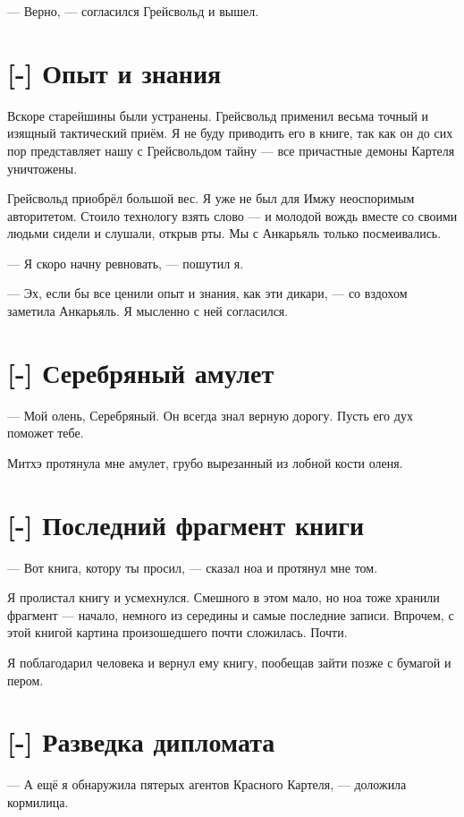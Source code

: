 --- Верно, --- согласился Грейсвольд и вышел.

\section{[-] Опыт и знания}

Вскоре старейшины были устранены.
Грейсвольд применил весьма точный и изящный тактический приём.
Я не буду приводить его в книге, так как он до сих пор представляет нашу с Грейсвольдом тайну --- все причастные демоны Картеля уничтожены.

Грейсвольд приобрёл большой вес.
Я уже не был для Имжу неоспоримым авторитетом.
Стоило технологу взять слово --- и молодой вождь вместе со своими людьми сидели и слушали, открыв рты.
Мы с Анкарьяль только посмеивались.

--- Я скоро начну ревновать, --- пошутил я.

--- Эх, если бы все ценили опыт и знания, как эти дикари, --- со вздохом заметила Анкарьяль.
Я мысленно с ней согласился.

\textspace

\section{[-] Серебряный амулет}

--- Мой олень, Серебряный.
Он всегда знал верную дорогу.
Пусть его дух поможет тебе.

Митхэ протянула мне амулет, грубо вырезанный из лобной кости оленя.

\section{[-] Последний фрагмент книги}

--- Вот книга, котору ты просил, --- сказал ноа и протянул мне том.

Я пролистал книгу и усмехнулся.
Смешного в этом мало, но ноа тоже хранили фрагмент --- начало, немного из середины и самые последние записи.
Впрочем, с этой книгой картина произошедшего почти сложилась.
Почти.

Я поблагодарил человека и вернул ему книгу, пообещав зайти позже с бумагой и пером.

\section{[-] Разведка дипломата}

--- А ещё я обнаружила пятерых агентов Красного Картеля, --- доложила кормилица.

